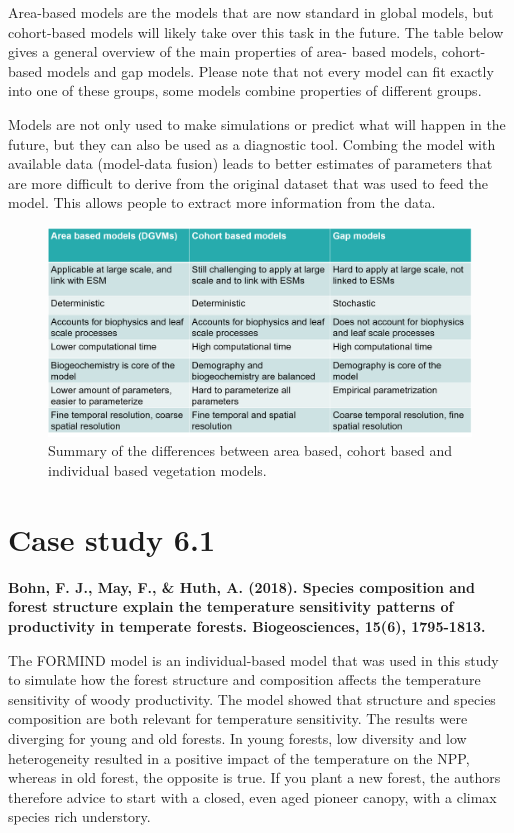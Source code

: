 \documentclass[12pt,oneside]{book}
\begin{document}
Area-based models are the models that are now standard in global models,
but cohort-based models will likely take over this task in the future.
The table below gives a general overview of the main properties of area-
based models, cohort-based models and gap models. Please note that not
every model can fit exactly into one of these groups, some models
combine properties of different groups.

Models are not only used to make simulations or predict what will happen
in the future, but they can also be used as a diagnostic tool. Combing
the model with available data (model-data fusion) leads to better
estimates of parameters that are more difficult to derive from the
original dataset that was used to feed the model. This allows people to
extract more information from the data.

\begin{figure}

{\centering \includegraphics[width=0.8\linewidth]{figures/chap6/f634_table} 

}

\caption{Summary of the differences between area based, cohort based and individual based vegetation models.}\label{fig:f634}
\end{figure}

\section{Case study 6.1}\label{case-study-6.1}

\textbf{Bohn, F. J., May, F., \& Huth, A. (2018). Species composition
and forest structure explain the temperature sensitivity patterns of
productivity in temperate forests. Biogeosciences, 15(6), 1795-1813.}

The FORMIND model is an individual-based model that was used in this
study to simulate how the forest structure and composition affects the
temperature sensitivity of woody productivity. The model showed that
structure and species composition are both relevant for temperature
sensitivity. The results were diverging for young and old forests. In
young forests, low diversity and low heterogeneity resulted in a
positive impact of the temperature on the NPP, whereas in old forest,
the opposite is true. If you plant a new forest, the authors therefore
advice to start with a closed, even aged pioneer canopy, with a climax
species rich understory.
\end{document}
